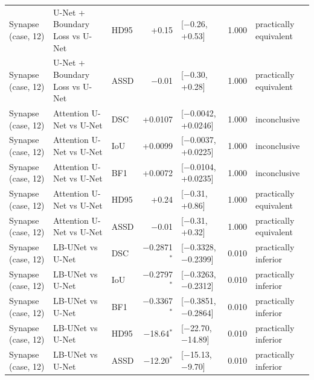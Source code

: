 \begin{tabular}{lllrlll}
Synapse (case, 12) & U-Net + Boundary Loss vs U-Net & HD95 & +0.15 & [$-$0.26, +0.53] & 1.000 & practically equivalent \\
Synapse (case, 12) & U-Net + Boundary Loss vs U-Net & ASSD & $-$0.01 & [$-$0.30, +0.28] & 1.000 & practically equivalent \\
Synapse (case, 12) & Attention U-Net vs U-Net & DSC & +0.0107 & [$-$0.0042, +0.0246] & 1.000 & inconclusive \\
Synapse (case, 12) & Attention U-Net vs U-Net & IoU & +0.0099 & [$-$0.0037, +0.0225] & 1.000 & inconclusive \\
Synapse (case, 12) & Attention U-Net vs U-Net & BF1 & +0.0072 & [$-$0.0104, +0.0235] & 1.000 & inconclusive \\
Synapse (case, 12) & Attention U-Net vs U-Net & HD95 & +0.24 & [$-$0.31, +0.86] & 1.000 & practically equivalent \\
Synapse (case, 12) & Attention U-Net vs U-Net & ASSD & $-$0.01 & [$-$0.31, +0.32] & 1.000 & practically equivalent \\
Synapse (case, 12) & LB-UNet vs U-Net & DSC & $-$0.2871$^{*}$ & [$-$0.3328, $-$0.2399] & 0.010 & practically inferior \\
Synapse (case, 12) & LB-UNet vs U-Net & IoU & $-$0.2797$^{*}$ & [$-$0.3263, $-$0.2312] & 0.010 & practically inferior \\
Synapse (case, 12) & LB-UNet vs U-Net & BF1 & $-$0.3367$^{*}$ & [$-$0.3851, $-$0.2864] & 0.010 & practically inferior \\
Synapse (case, 12) & LB-UNet vs U-Net & HD95 & $-$18.64$^{*}$ & [$-$22.70, $-$14.89] & 0.010 & practically inferior \\
Synapse (case, 12) & LB-UNet vs U-Net & ASSD & $-$12.20$^{*}$ & [$-$15.13, $-$9.70] & 0.010 & practically inferior \\
\bottomrule
\end{tabular}
